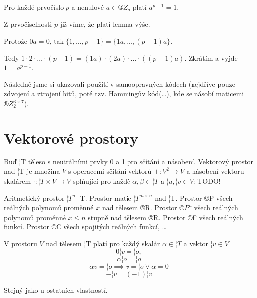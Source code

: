 \documentclass[12pt]{article}					%
\begin{document}
        \begin{veta}
            Pro každé prvočíslo $p$ a nenulové $a \in ®Z_p$ platí $a^{p-1} = 1$.

            \begin{dukazin}
                Z prvočíselnosti $p$ již víme, že platí lemma výše.

                Protože $0a = 0$, tak $\{1, …, p-1\} = \{1a, …, (p-1)a\}$.

                Tedy $1 · 2 ·…· (p-1) = (1a)·(2a)·…·((p-1)a)$. Zkrátím a vyjde $1 = a^{p-1}$.
            \end{dukazin}
        \end{veta}

        \begin{poznamka}
                Následně jsme si ukazovali použití v samoopravných kódech (nejdříve pouze zdvojení a ztrojení bitů, poté tzv. Hammingův kód(…), kde se násobí maticemi $®Z_2^{3\times 7}$).
        \end{poznamka}

\section{Vektorové prostory}
    \begin{definice}
        Buď ¦T těleso s neutrálními prvky 0 a 1 pro sčítání a násobení. Vektorový prostor nad ¦T je množina $V$ s operacemi sčítání vektorů $+: V^2 \rightarrow V$ a násobení vektoru skalárem $·: ¦T \times V \rightarrow V$ splňující pro každé $\alpha, \beta \in ¦T$ a $¦u, ¦v \in V$: TODO!

    \end{definice}

    \begin{priklady}
        Aritmetický prostor $¦T^n$ ¦T. Prostor matic $¦T^{m\times n}$ nad ¦T. Prostor ©P všech reálných polynomů proměnné $x$ nad tělesem ®R. Prostor $©P^n$ všech reálných polynomů proměnné $x ≤ n$ stupně nad tělesem ®R. Prostor ©F všech reálných funkcí. Prostor ©C všech spojitých reálných funkcí, …
    \end{priklady}

    \begin{tvrzeni}
        V prostoru $V$ nad tělesem ¦T platí pro každý skalár $\alpha \in ¦T$ a vektor $¦v \in V$
        $$ 0¦v = ¦o, $$
        $$ \alpha ¦o = ¦o $$ 
        $$ \alpha v = ¦o \implies v = ¦o \lor \alpha = 0 $$
        $$ -¦v = (-1)¦v $$
        \begin{dukazin}
            Stejný jako u ostatních vlastností.
        \end{dukazin}
    \end{tvrzeni}
\end{document}
